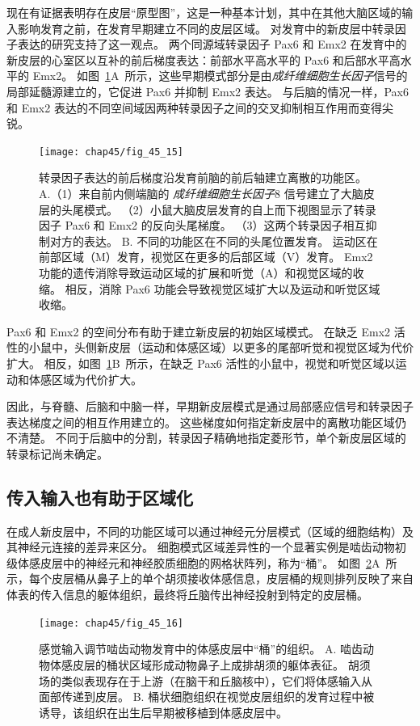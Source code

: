 现在有证据表明存在皮层“原型图”，这是一种基本计划，其中在其他大脑区域的输入影响发育之前，在发育早期建立不同的皮层区域。
对发育中的新皮层中转录因子表达的研究支持了这一观点。
两个同源域转录因子 Pax6 和 Emx2 在发育中的新皮层的心室区以互补的前后梯度表达：前部水平高水平的 Pax6 和后部水平高水平的 Emx2。
如图~\ref{fig:45_15}A~所示，这些早期模式部分是由\textit{成纤维细胞生长因子}信号的局部延髓源建立的，它促进 Pax6 并抑制 Emx2 表达。
与后脑的情况一样，Pax6 和 Emx2 表达的不同空间域因两种转录因子之间的交叉抑制相互作用而变得尖锐。


\begin{figure}[htbp]
	\centering
	\texttt{[image: chap45/fig\_45\_15]}
	\caption{转录因子表达的前后梯度沿发育前脑的前后轴建立离散的功能区\cite{hamasaki2004emx2}。
		A.（1）来自前内侧端脑的 \textit{成纤维细胞生长因子}8 信号建立了大脑皮层的头尾模式。
		（2）小鼠大脑皮层发育的自上而下视图显示了转录因子 Pax6 和 Emx2 的反向头尾梯度。
		（3）这两个转录因子相互抑制对方的表达。
		B. 不同的功能区在不同的头尾位置发育。
		运动区在前部区域（M）发育，视觉区在更多的后部区域（V）发育。
		Emx2 功能的遗传消除导致运动区域的扩展和听觉（A）和视觉区域的收缩。
		相反，消除 Pax6 功能会导致视觉区域扩大以及运动和听觉区域收缩。}
	\label{fig:45_15}
\end{figure}


Pax6 和 Emx2 的空间分布有助于建立新皮层的初始区域模式。
在缺乏 Emx2 活性的小鼠中，头侧新皮层（运动和体感区域）以更多的尾部听觉和视觉区域为代价扩大。
相反，如图~\ref{fig:45_15}B~所示，在缺乏 Pax6 活性的小鼠中，视觉和听觉区域以运动和体感区域为代价扩大。


因此，与脊髓、后脑和中脑一样，早期新皮层模式是通过局部感应信号和转录因子表达梯度之间的相互作用建立的。
这些梯度如何指定新皮层中的离散功能区域仍不清楚。
不同于后脑中的分割，转录因子精确地指定菱形节，单个新皮层区域的转录标记尚未确定。



\subsection{传入输入也有助于区域化}

在成人新皮层中，不同的功能区域可以通过神经元分层模式（区域的细胞结构）及其神经元连接的差异来区分。
细胞模式区域差异性的一个显著实例是啮齿动物初级体感皮层中的神经元和神经胶质细胞的网格状阵列，称为“桶”。
如图~\ref{fig:45_16}A~所示，每个皮层桶从鼻子上的单个胡须接收体感信息，皮层桶的规则排列反映了来自体表的传入信息的躯体组织，最终将丘脑传出神经投射到特定的皮层桶。


\begin{figure}[htbp]
	\centering
	\texttt{[image: chap45/fig\_45\_16]}
	\caption{感觉输入调节啮齿动物发育中的体感皮层中“桶”的组织\cite{schlaggar1991potential}。
		A. 啮齿动物体感皮层的桶状区域形成动物鼻子上成排胡须的躯体表征。
		胡须场的类似表现存在于上游（在脑干和丘脑核中），它们将体感输入从面部传递到皮层。
		B. 桶状细胞组织在视觉皮层组织的发育过程中被诱导，该组织在出生后早期被移植到体感皮层中。}
	\label{fig:45_16}
\end{figure}


